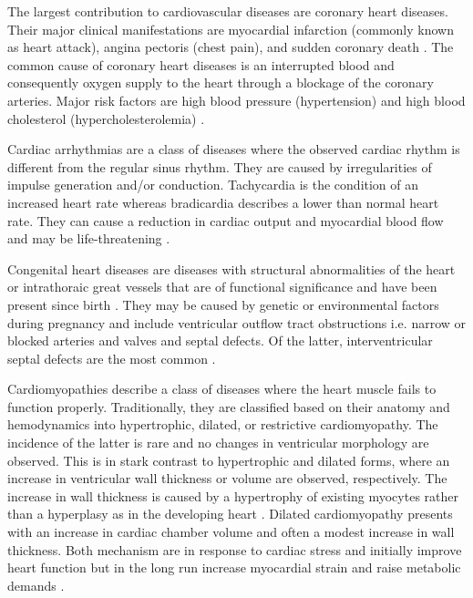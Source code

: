 The largest contribution to cardiovascular diseases are coronary heart diseases. Their major clinical manifestations are myocardial infarction (commonly known as heart attack), angina pectoris (chest pain), and sudden coronary death \citep{Wong2014}. The common cause of coronary heart diseases is an interrupted blood and consequently oxygen supply to the heart through a blockage of the coronary arteries. Major risk factors are high blood pressure (hypertension) and high blood cholesterol (hypercholesterolemia) \citep{Mackay2004}.

Cardiac arrhythmias are a class of diseases where the observed cardiac rhythm is different from the regular sinus rhythm. They are caused by irregularities of impulse generation and/or conduction. Tachycardia is the condition of an increased heart rate whereas bradicardia describes a lower than normal heart rate. They can cause a reduction in cardiac output and myocardial blood flow and may be life-threatening \citep{Durham2002}.

Congenital heart diseases are diseases with structural abnormalities of the heart or intrathoraic great vessels that are of functional significance and have been present since birth \citep{Mitchell1971}. They may be caused by genetic or environmental factors during pregnancy and include ventricular outflow tract  obstructions i.e. narrow or blocked arteries and valves and septal defects. Of the latter, interventricular septal defects are the most common \citep{Hoffman2005}.


Cardiomyopathies describe a class of diseases where the heart muscle fails to function properly. Traditionally, they are classified based on their anatomy and hemodynamics into hypertrophic, dilated, or restrictive cardiomyopathy. The incidence of the latter is rare and no changes in ventricular morphology are observed. This is in stark contrast to hypertrophic and dilated forms, where an increase in ventricular wall thickness or volume are observed, respectively. The increase in wall thickness is caused by a hypertrophy of existing myocytes rather than a hyperplasy as in the developing heart \citep{Lorell2000}. Dilated cardiomyopathy presents with an increase in cardiac chamber volume and often a modest increase in wall thickness. Both mechanism are in response to cardiac stress and initially improve heart function but in the long run increase myocardial strain and raise metabolic demands \citep{Seidman2001}.

